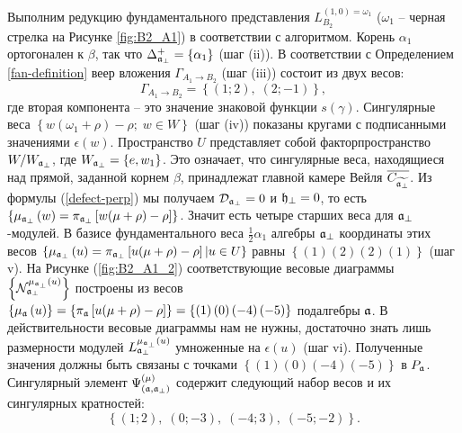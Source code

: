Выполним редукцию фундаментального представления  $L^{(1,0)=\omega_1}_{B_2}$ ($\omega_1$ -- черная стрелка на Рисунке \ref{fig:B2_A1}) в соответствии с алгоритмом.
Корень $\alpha_1$ ортогонален к $\beta$, так что  $\Delta_{\mathfrak{a}_{\perp}}^+ = \left\{ \alpha_1 \right\}$ (шаг (ii)).
В соответствии с Определением \ref{fan-definition} веер вложения $\Gamma_{A_1\to B_2}$ (шаг (iii)) состоит из двух весов:
\begin{equation*}
  \label{eq:22}
  \Gamma_{A_1\to B_2}=\left\{ (1;2),\; (2;-1) \right\},
\end{equation*}
где вторая компонента -- это значение знаковой функции  $s(\gamma)$.
Сингулярные веса  $\left\{ w (\omega_1 +\rho)-\rho ;\;w \in W\right\}$ (шаг (iv)) показаны кругами с подписанными значениями $\epsilon\left( w \right)$. Пространство  $U$ представляет собой факторпространство $W/W_{\mathfrak{a}_{\perp}}$, где $W_{\mathfrak{a}_{\perp}}=\left\{e,w_1\right\}$. Это означает, что сингулярные веса, находящиеся над прямой, заданной корнем $\beta$, принадлежат главной камере Вейля $\overline{C_{\widetilde{\mathfrak{a}_{\perp }}}}$. Из формулы (\ref{defect-perp})  мы получаем  $\mathcal{D}_{\mathfrak{a}_{\perp }}=0$ и $\mathfrak{h}_{\perp }=0$, то есть $\left\{ \mu _{\mathfrak{a}_{\perp}}\left( w\right)=\pi _{\mathfrak{a}_{\perp}}\left[ w(\mu +\rho)-\rho \right]\right\}$. Значит есть четыре старших веса для $\mathfrak{a}_{\perp }$-модулей.  В базисе фундаментального веса $\frac{1}{2} \alpha_1$ алгебры $\mathfrak{a}_{\perp}$ координаты этих весов
$\left\{ \mu _{\mathfrak{a}_{\perp}}\left( u\right)=\pi _{\mathfrak{a}_{\perp}}\left[ u(\mu +\rho)-\rho \right]| u \in U \right\}$
равны
$\left\{ \left( 1\right) \left( 2\right) \left( 2\right) \left( 1\right) \right\}$ (шаг v).
На Рисунке (\ref{fig:B2_A1_2}) соответствующие весовые диаграммы
$\left\{ \mathcal{N}_{\mathfrak{a}_{\perp }}^{\mu _{\mathfrak{a}_{\perp }}\left( u\right) }\right\} $
построены из весов $\left\{ \mu _{\mathfrak{a}}\left( u\right)\right\} =\left\{\pi _{\mathfrak{a}}\left[ u(\mu +\rho )-\rho \right]\right\}
=\left\{ \left( 1\right) \left( 0\right) \left( -4\right) \left( -5\right) \right\}$ подалгебры   $\mathfrak{a}$.
В действительности весовые диаграммы нам не нужны, достаточно знать лишь размерности модулей
$L_{\mathfrak{a}_{\perp }}^{\mu_{\mathfrak{a}_{\perp }}\left( u\right) }$ умноженные на
$\epsilon \left( u\right) $ (шаг vi). Полученные значения должны быть связаны с точками
$\left\{ \left( 1\right) \left( 0\right) \left( -4\right) \left( -5\right) \right\}$ в $P_{\mathfrak{a}}$. Сингулярный элемент $\Psi ^{\left( \mu \right) }_{\left(  \mathfrak{a}, \mathfrak{a}_{\perp} \right)}$ содержит следующий набор весов и их сингулярных кратностей:
\begin{equation}
  \label{eq:25}
  \left\{(1;2),\; (0;-3),\; (-4;3),\; (-5;-2)\right\}.
\end{equation}

